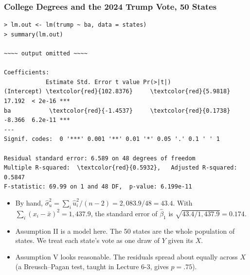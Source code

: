 \documentclass[xcolor=svgnames,9pt,english,aspectratio=169,t]{beamer}
\begin{document}

\begin{frame}[fragile]
\frametitle{College Degrees and the 2024 Trump Vote, 50 States}
{
\footnotesize
\begin{Verbatim}[frame=single, label=R Code, commandchars=\\\{\}]
> lm.out <- lm(trump ~ ba, data = states)
> summary(lm.out)

~~~~ output omitted ~~~~

Coefficients:
            Estimate Std. Error t value Pr(>|t|)
(Intercept) \textcolor{red}{102.8376}     \textcolor{red}{5.9818}  17.192  < 2e-16 ***
ba           \textcolor{red}{-1.4537}     \textcolor{red}{0.1738}  -8.366  6.2e-11 ***
---
Signif. codes:  0 '***' 0.001 '**' 0.01 '*' 0.05 '.' 0.1 ' ' 1

Residual standard error: 6.589 on 48 degrees of freedom
Multiple R-squared:  \textcolor{red}{0.5932},	Adjusted R-squared:  0.5847
F-statistic: 69.99 on 1 and 48 DF,  p-value: 6.199e-11
\end{Verbatim}
}
\small
\begin{itemize}
\item By hand, $\hat\sigma^2_u = \sum_i \hat u_i^2/(n-2) = 2{,}083.9/48 = 43.4$. With $\sum_i (x_i-\bar x)^2 = 1{,}437.9$, the standard error of $\hat\beta_1$ is $\sqrt{43.4/1{,}437.9} = 0.174$.
\item Assumption II is a model here. The 50 states are the whole population of states. We treat each state's vote as one draw of $Y$ given its $X$.
\item Assumption V looks reasonable. The residuals spread about equally across $X$ (a Breusch--Pagan test, taught in Lecture 6-3, gives $p = .75$).
\end{itemize}
\end{frame}
\end{document}
